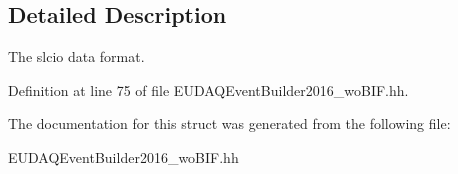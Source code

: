 \subsection{Detailed Description}
The slcio data format. 

Definition at line 75 of file EUDAQEventBuilder2016\_\-woBIF.hh.

The documentation for this struct was generated from the following file:\begin{DoxyCompactItemize}
\item 
EUDAQEventBuilder2016\_\-woBIF.hh\end{DoxyCompactItemize}
